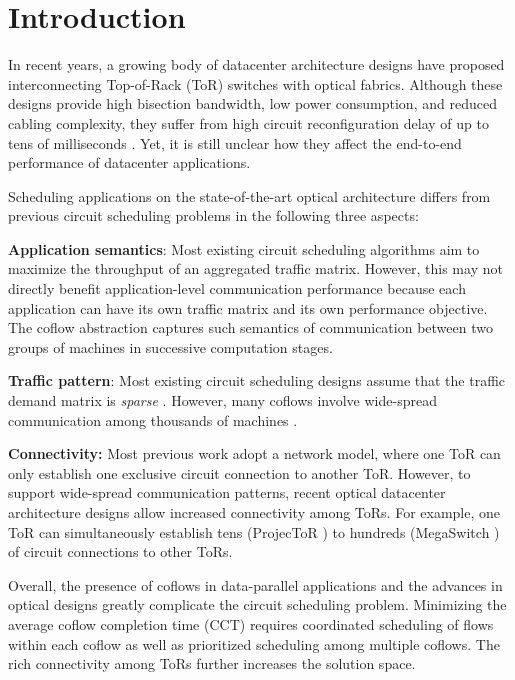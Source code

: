 \section{Introduction}
\label{sec:intro}
In recent years, a growing body of datacenter architecture designs \cite{mordia-ptl,projector,megaswitch,osa,cthrough} have proposed interconnecting Top-of-Rack (ToR) switches with optical fabrics.
Although these designs provide high bisection bandwidth, low power consumption, and reduced cabling complexity, they suffer from high circuit reconfiguration delay of up to tens of milliseconds \cite{megaswitch}.
Yet, it is still unclear how they affect the end-to-end performance of datacenter applications.

Scheduling applications on the state-of-the-art optical architecture \cite{projector,megaswitch} differs from previous circuit scheduling problems \cite{eclipse,sunflow,solstice} in the following three aspects:
\begin{icompact}
\item{\textbf{Application semantics}: Most existing circuit scheduling algorithms aim to maximize the throughput of an aggregated traffic matrix. %
    However, this may not directly benefit application-level communication
performance \cite{varys} because each application can have its own traffic matrix and its own performance objective.
The coflow abstraction \cite{coflow} captures such semantics of communication between two groups of machines in successive computation stages.
}
\item{\textbf{Traffic pattern}: Most existing circuit scheduling designs assume that the traffic demand matrix is \emph{sparse} \cite{cthrough,eclipse}. However, many coflows involve wide-spread communication among thousands of machines \cite{varys}.
    }
\item{\textbf{Connectivity:} Most previous work adopt a network model, where one ToR can only establish one exclusive circuit connection to another ToR.
However, to support wide-spread communication patterns, recent optical datacenter architecture designs \cite{projector,megaswitch} allow increased connectivity among ToRs.
For example, one ToR can simultaneously establish tens (ProjecToR \cite{projector}) to hundreds (MegaSwitch \cite{megaswitch}) of circuit connections to other ToRs.}
\end{icompact}
Overall, the presence of coflows in data-parallel applications and the advances in optical designs greatly complicate the circuit scheduling problem.
Minimizing the average coflow completion time (CCT) requires coordinated scheduling of flows within each coflow as well as prioritized scheduling among multiple coflows.
The rich connectivity among ToRs further increases the solution space.

